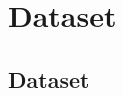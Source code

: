 \documentclass[compress,aspectratio=169,xcolor=table]{beamer}
\newcommand{\normalizeblocktitle}{\parbox{0pt}{\rule{0pt}{1em}}}
\begin{document}



\section{Dataset}\subsection{Dataset}
\end{document}

